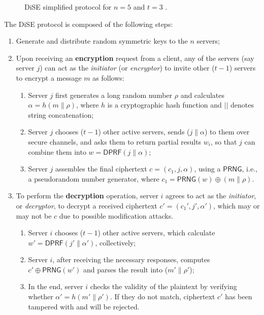 \begin{figure}[h]
    \begin{center}
    \end{center}
    \caption{DiSE simplified protocol for $n=5$ and $t=3$ \cite{dise}.}
    \label{fig:dise-simple-algo}
\end{figure}

The DiSE protocol is composed of the following steps:
\begin{enumerate}
    \item Generate and distribute random symmetric keys to the $n$ servers;
    \item Upon receiving an \textbf{encryption} request from a client, any of the servers (say server $j$) can act as the \textit{initiator} (or \textit{encryptor}) to invite other ($t - 1$) servers to encrypt a message $m$ as follows:

    \begin{enumerate}
        \item Server $j$ first generates a long random number $\rho$ and calculates $\alpha = h(m \| \rho)$, where $h$ is a cryptographic hash function and $||$ denotes string concatenation;
        \item  Server $j$ chooses ($t - 1$) other active servers, sends ($j \| \alpha$) to them over secure channels, and asks them to return partial results $w_i$, so that $j$ can combine them into $w = \mathsf{DPRF}(j \| \alpha)$;
        \item Server $j$ assembles the final ciphertext $c = (c_1, j, \alpha)$, using a $\mathsf{PRNG}$, i.e., a pseudorandom number generator, where $c_1 = \mathsf{PRNG}(w) \oplus (m \| \rho)$.
    \end{enumerate}
    
    \item To perform the \textbf{decryption} operation, server $i$ agrees to act as the \textit{initiator}, or \textit{decryptor}, to decrypt a received ciphertext $c' = (c_1', j', \alpha')$, which may or may not be $c$ due to possible modification attacks.

    \begin{enumerate}
        \item Server $i$ chooses ($t - 1$) other active servers, which calculate $w' = \mathsf{DPRF}(j' \| \alpha')$, collectively;
        \item Server $i$, after receiving the necessary responses, computes $c' \oplus \mathsf{PRNG}(w')$ and parses the result into ($m' \| \rho'$);
        \item In the end, server $i$ checks the validity of the plaintext by verifying whether $\alpha' = h(m' \| \rho')$. If they do not match, ciphertext $c'$ has been tampered with and will be rejected.
    \end{enumerate}
\end{enumerate}

